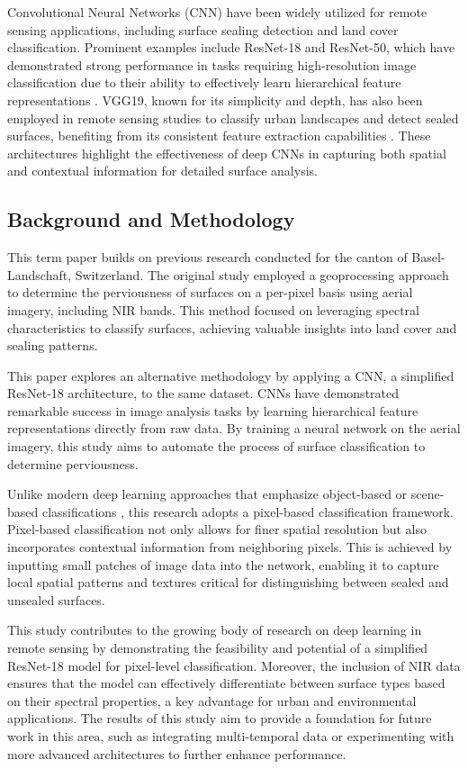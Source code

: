 Convolutional Neural Networks (CNN) have been widely utilized for remote sensing applications, 
including surface sealing detection and land cover classification. 
Prominent examples include ResNet-18 and ResNet-50, which have demonstrated strong performance 
in tasks requiring high-resolution image classification due to their ability to effectively 
learn hierarchical feature representations \autocite{natyaDeepTransferLearning2022}. 
VGG19, known for its simplicity and depth, has also been employed in remote sensing studies
to classify urban landscapes and detect sealed surfaces, benefiting from its consistent 
feature extraction capabilities \autocite{alemTransferLearningModels2022}. 
These architectures highlight the effectiveness of deep CNNs in 
capturing both spatial and contextual information for detailed surface analysis.




\subsection{Background and Methodology}

This term paper builds on previous research conducted for the canton of Basel-Landschaft, 
Switzerland. The original study employed a geoprocessing approach to determine the 
perviousness of surfaces on a per-pixel basis using aerial imagery, including NIR bands. 
This method focused on leveraging spectral characteristics to classify surfaces, 
achieving valuable insights into land cover and sealing patterns.

This paper explores an alternative methodology by applying a CNN, a simplified ResNet-18
architecture, to the same dataset. CNNs have 
demonstrated remarkable success in image analysis tasks by learning hierarchical feature 
representations directly from raw data. By training a neural network on the aerial 
imagery, this study aims to automate the process of surface classification to determine
perviousness.

Unlike modern deep learning approaches that emphasize object-based or scene-based 
classifications \autocite{thapaDeepLearningRemote2023}, this research adopts a 
pixel-based classification framework. Pixel-based classification not only allows for 
finer spatial resolution but also incorporates contextual information from neighboring 
pixels. This is achieved by inputting small patches of image data into the network, 
enabling it to capture local spatial patterns and textures critical for distinguishing 
between sealed and unsealed surfaces.

This study contributes to the growing body of research on deep learning in remote 
sensing by demonstrating the feasibility and potential of a simplified ResNet-18 model 
for pixel-level classification. Moreover, the inclusion of NIR data ensures that the 
model can effectively differentiate between surface types based on their spectral 
properties, a key advantage for urban and environmental applications. The results of 
this study aim to provide a foundation for future work in this area, such as integrating 
multi-temporal data or experimenting with more advanced architectures to further enhance 
performance.